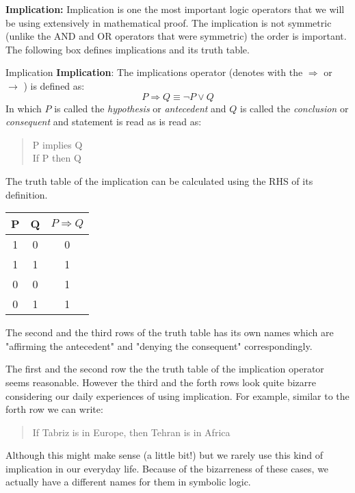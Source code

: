 \textbf{Implication:} Implication is one the most important logic operators that we will be using extensively in mathematical proof. The implication is not symmetric (unlike the AND and OR operators that were symmetric) the order is important. The following box defines implications and its truth table.

\begin{defbox}{Implication}
	\textbf{Implication}: The implications operator (denotes with the $\Rightarrow$ or $\rightarrow$ ) is defined as:
	\[  P \Rightarrow Q \equiv \neg P \vee Q \]
	In which $ P $ is called the \emph{hypothesis} or \emph{antecedent} and $ Q $ is called the \emph{conclusion} or \emph{consequent} and statement is read as is read as: 
	\begin{quote}
		P implies Q\\
		If P then Q
	\end{quote}
	The truth table of the implication can be calculated using the RHS of its definition. 
	\begin{center}
		\begin{tabular}{|c|c|c|}
			\hline
			P & Q & $ P \Rightarrow Q $ \\
			\hline
			1 & 0 & 0 \\
			\hline
			1 & 1 & 1 \\
			\hline
			0 & 0 & 1 \\
			\hline
			0 & 1 & 1 \\
			\hline
		\end{tabular}
	\end{center}

The second and the third rows of the truth table has its own names which are "affirming the antecedent" and "denying the consequent" correspondingly.

\end{defbox}

The first and the second row the the truth table of the implication operator seems reasonable. However the third and the forth rows look quite bizarre considering our daily experiences of using implication. For example, similar to the forth row we can write:
\begin{quote}
	If Tabriz is in Europe, then Tehran is in Africa
\end{quote}
Although this might make sense (a little bit!) but we rarely use this kind of implication in our everyday life. Because of the bizarreness of these cases, we actually have a different names for them in symbolic logic.

